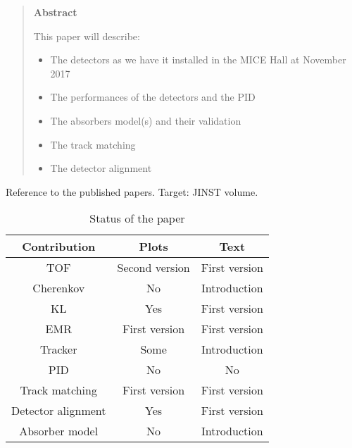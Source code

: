 \begin{quotation}
\begin{center}
\textbf{Abstract}
\end{center}
  \noindent
  This paper will describe:
  \begin{itemize}
    \item The detectors as we have it installed in the MICE Hall at November 2017
    \item The performances of the detectors and the PID
    \item The absorbers model(s) and their validation
    \item The track matching
    \item The detector alignment
  \end{itemize}
\end{quotation}

\noindent

Reference to the published papers.
Target: JINST volume.

\begin{table}[!ht]
  \caption{Status of the paper}
  \label{tab:}

  \begin{center}
    \begin{tabular}{c|c|c}
        \hline
       Contribution         & Plots             & Text\\
       \hline
       TOF                  & Second version    & First version \\
       Cherenkov            & No                & Introduction \\
       KL                   & Yes               & First version \\
       EMR                  & First version     & First version \\
       Tracker              & Some              & Introduction \\
       PID                  & No                & No \\
       Track matching       & First version     & First version \\
       Detector alignment   & Yes               & First version \\
       Absorber model       & No                & Introduction \\
       
       \hline
    \end{tabular}
  \end{center}
\end{table}
